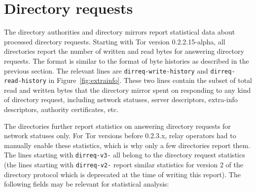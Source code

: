 \documentclass{article}
\begin{document}
\section{Directory requests}

The directory authorities and directory mirrors report statistical data
about processed directory requests.
Starting with Tor version 0.2.2.15-alpha, all directories report the
number of written and read bytes for answering directory requests.
The format is similar to the format of byte histories as described in the
previous section.
The relevant lines are \verb+dirreq-write-history+ and
\verb+dirreq-read-history+ in Figure~\ref{fig:extrainfo}.
These two lines contain the subset of total read and written bytes that
the directory mirror spent on responding to any kind of directory request,
including network statuses, server descriptors, extra-info descriptors,
authority certificates, etc.

The directories further report statistics on answering directory requests
for network statuses only.
For Tor versions before 0.2.3.x, relay operators had to manually enable
these statistics, which is why only a few directories report them.
The lines starting with \verb+dirreq-v3-+ all belong to the directory
request statistics (the lines starting with \verb+dirreq-v2-+ report
similar statistics for version 2 of the directory protocol which is
deprecated at the time of writing this report).
The following fields may be relevant for statistical analysis:
\end{document}
